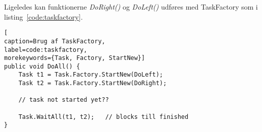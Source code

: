 Ligeledes kan funktionerne \textit{DoRight()} og \textit{DoLeft()} udføres med TaskFactory som i listing~\ref{code:taskfactory}.

\begin{minipage}{\linewidth}
\begin{lstlisting}[
caption=Brug af TaskFactory,
label=code:taskfactory,
morekeywords={Task, Factory, StartNew}]
public void DoAll() {
	Task t1 = Task.Factory.StartNew(DoLeft);
	Task t2 = Task.Factory.StartNew(DoRight);
	
	// task not started yet??
	
	Task.WaitAll(t1, t2);	// blocks till finished
}
\end{lstlisting}
\end{minipage}

